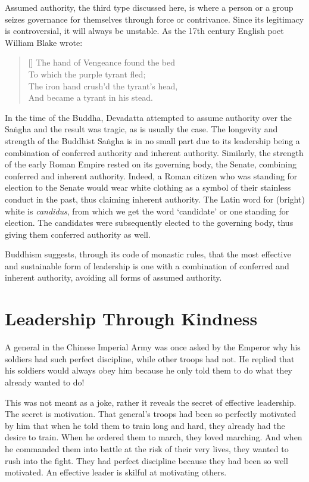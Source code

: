 \documentclass[11pt, openany]{book}
\begin{document}
Assumed authority, the third type discussed here, is where a person or a group seizes governance for themselves through force or contrivance. Since its legitimacy is controversial, it will always be unstable. As the 17th century English poet William Blake wrote:

\begin{verse} [\versewidth]
The hand of Vengeance found the bed\\
To which the purple tyrant fled;\\
The iron hand crush’d the tyrant’s head,\\
And became a tyrant in his stead.
\end{verse}

In the time of the Buddha, Devadatta attempted to assume authority over the Saṅgha and the result was tragic, as is usually the case. The longevity and strength of the Buddhist Saṅgha is in no small part due to its leadership being a combination of conferred authority and inherent authority. Similarly, the strength of the early Roman Empire rested on its governing body, the Senate, combining conferred and inherent authority. Indeed, a Roman citizen who was standing for election to the Senate would wear white clothing as a symbol of their stainless conduct in the past, thus claiming inherent authority. The Latin word for (bright) white is \emph{candidus}, from which we get the word ‘candidate’ or one standing for election. The candidates were subsequently elected to the governing body, thus giving them conferred authority as well.

Buddhism suggests, through its code of monastic rules, that the most effective and sustainable form of leadership is one with a combination of conferred and inherent authority, avoiding all forms of assumed authority.

\section{Leadership Through Kindness}

A general in the Chinese Imperial Army was once asked by the Emperor why his soldiers had such perfect discipline, while other troops had not. He replied that his soldiers would always obey him because he only told them to do what they already wanted to do!

This was not meant as a joke, rather it reveals the secret of effective leadership. The secret is motivation. That general’s troops had been so perfectly motivated by him that when he told them to train long and hard, they already had the desire to train. When he ordered them to march, they loved marching. And when he commanded them into battle at the risk of their very lives, they wanted to rush into the fight. They had perfect discipline because they had been so well motivated. An effective leader is skilful at motivating others.
\end{document}
